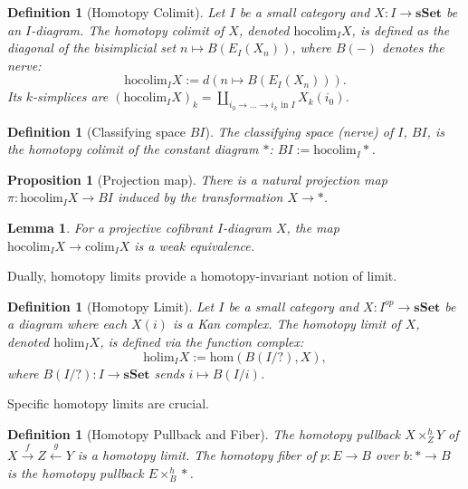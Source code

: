 \documentclass[12pt]{report}
\numberwithin{equation}{section}
\newtheorem{definition}[dummy]{Definition}
\newtheorem{lemma}[dummy]{Lemma}
\newtheorem{proposition}[dummy]{Proposition}
\begin{document}
	\begin{definition}[Homotopy Colimit]
		Let $I$ be a small category and $X: I \to \mathbf{sSet}$ be an $I$-diagram. The homotopy colimit of $X$, denoted $\mathrm{hocolim}_{I} X$, is defined as the diagonal of the bisimplicial set $n \mapsto B(E_I(X_n))$, where $B(-)$ denotes the nerve:
		\[ \mathrm{hocolim}_{I} X := d( n \mapsto B(E_I(X_n)) ). \]
		Its $k$-simplices are $(\mathrm{hocolim}_{I} X)_k = \coprod_{i_0 \to \dots \to i_k \text{ in } I} X_k(i_0)$.
	\end{definition}
	
	\begin{definition}[Classifying space $BI$]
		The classifying space (nerve) of $I$, $BI$, is the homotopy colimit of the constant diagram $*$: $BI := \mathrm{hocolim}_{I} *$.
	\end{definition}
	
	\begin{proposition}[Projection map]
		There is a natural projection map $\pi: \mathrm{hocolim}_{I} X \to BI$ induced by the transformation $X \to *$.
	\end{proposition}
	
	\begin{lemma}\label{lem:hocolim_vs_colim_condensed}
		For a projective cofibrant $I$-diagram $X$, the map $\mathrm{hocolim}_{I} X \to \mathrm{colim}_{I} X$ is a weak equivalence.
	\end{lemma}
	
	Dually, homotopy limits provide a homotopy-invariant notion of limit.
	
	\begin{definition}[Homotopy Limit]
		Let $I$ be a small category and $X: I^{op} \to \mathbf{sSet}$ be a diagram where each $X(i)$ is a Kan complex. The homotopy limit of $X$, denoted $\mathrm{holim}_{I} X$, is defined via the function complex:
		\[ \mathrm{holim}_{I} X := \mathrm{hom}(B(I/?), X), \]
		where $B(I/?): I \to \mathbf{sSet}$ sends $i \mapsto B(I/i)$.
	\end{definition}
	
	Specific homotopy limits are crucial.
	
	\begin{definition}[Homotopy Pullback and Fiber]
		The homotopy pullback $X \times^h_Z Y$ of $X \xrightarrow{f} Z \xleftarrow{g} Y$ is a homotopy limit. The homotopy fiber of $p: E \to B$ over $b: * \to B$ is the homotopy pullback $E \times^h_B *$.
	\end{definition}
	
\end{document}
